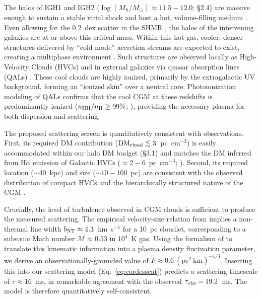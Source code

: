 \documentclass[twocolumn, linenumbers, tra]{aastex631}
\begin{document}
The halos of IGH1 and IGH2 ($\log(M_h/M_{\odot}) \approx 11.5-12.0$; \S2.4) are massive enough to sustain a stable virial shock and host a hot, volume-filling medium \citep{Dekel2006, Keres2005}. Even allowing for the 0.2~dex scatter in the SHMR \citep{Girelli2020}, the halos of the intervening galaxies are at or above this critical mass. Within this hot gas, cooler, denser structures delivered by ``cold mode'' accretion streams are expected to exist, creating a multiphase environment \citep{FaucherGiguere2023}. Such structures are observed locally as High-Velocity Clouds (HVCs) and in external galaxies via quasar absorption lines (QALs) \citep{Putman2012, Werk2014}. These cool clouds are highly ionized, primarily by the extragalactic UV background, forming an ``ionized skin'' over a neutral core. Photoionization modeling of QALs confirms that the cool CGM at these redshifts is predominantly ionized ($n_{\rm HII}/n_{\rm H} \ge 99\%$; \citealp{Werk2014}), providing the necessary plasma for both dispersion and scattering.

The proposed scattering screen is quantitatively consistent with observations. First, its required DM contribution ($\mathrm{DM}_{\rm cloud} \lesssim 3$~pc~cm$^{-3}$) is easily accommodated within our halo DM budget (\S3.1) and matches the DM inferred from H$\alpha$ emission of Galactic HVCs ($\approx 2-6$~pc~cm$^{-3}$; \citealp{Tufte1999, Shull2011}). Second, its required location ($\sim 40$~kpc) and size ($\sim 10-100$~pc) are consistent with the observed distribution of compact HVCs and the hierarchically structured nature of the CGM \citep{Lehner2022, McCourt2018, Chen2023}.

Crucially, the level of turbulence observed in CGM clouds is sufficient to produce the measured scattering. The empirical velocity-size relation from \citet{Chen2023} implies a non-thermal line width $b_{\rm NT} \approx 4.3$~km~s$^{-1}$ for a 10~pc cloudlet, corresponding to a subsonic Mach number $\mathcal{M} \approx 0.53$ in $10^4$~K gas. Using the formalism of \citet{Ocker2025} to translate this kinematic information into a plasma density fluctuation parameter, we derive an observationally-grounded value of $\widetilde{F} \approx 0.6~(\mathrm{pc}^2~\mathrm{km})^{-1/3}$. Inserting this into our scattering model (Eq.~\ref{eq:cordesscat}) predicts a scattering timescale of $\tau \approx 16$~ms, in remarkable agreement with the observed $\tau_{\rm obs} = 19.2$~ms. The model is therefore quantitatively self-consistent.
\end{document}
